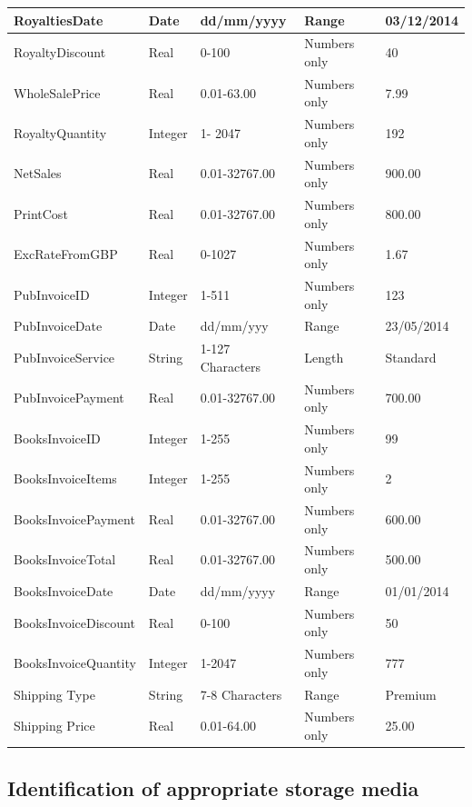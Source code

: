 \begin{center}
\begin{tabular}{|p{2cm}|p{1cm}|p{2.5cm}|p{1.5cm}|p{3cm}|}
    RoyaltiesDate & Date & dd/mm/yyyy & Range & 03/12/2014 \\ \hline
    RoyaltyDiscount & Real & 0-100 & Numbers only & 40 \\ \hline
    WholeSalePrice & Real & 0.01-63.00 & Numbers only & 7.99 \\ \hline
    RoyaltyQuantity & Integer & 1- 2047 & Numbers only & 192 \\ \hline
    NetSales & Real & 0.01-32767.00 & Numbers only & 900.00 \\ \hline
    PrintCost & Real & 0.01-32767.00 & Numbers only & 800.00 \\ \hline
    ExcRateFromGBP & Real & 0-1027 & Numbers only & 1.67 \\ \hline
    PubInvoiceID & Integer & 1-511 & Numbers only & 123 \\ \hline
    PubInvoiceDate & Date & dd/mm/yyy & Range & 23/05/2014 \\ \hline
    PubInvoiceService & String & 1-127 Characters & Length & Standard \\ \hline
    PubInvoicePayment & Real & 0.01-32767.00 & Numbers only & 700.00 \\ \hline
    BooksInvoiceID & Integer & 1-255 & Numbers only & 99 \\ \hline
    BooksInvoiceItems & Integer & 1-255 & Numbers only & 2 \\ \hline
    BooksInvoicePayment & Real & 0.01-32767.00 & Numbers only & 600.00 \\ \hline
    BooksInvoiceTotal & Real & 0.01-32767.00 & Numbers only & 500.00 \\ \hline
    BooksInvoiceDate & Date & dd/mm/yyyy & Range & 01/01/2014 \\ \hline
    BooksInvoiceDiscount & Real & 0-100 & Numbers only & 50 \\ \hline
    BooksInvoiceQuantity & Integer & 1-2047 & Numbers only & 777 \\ \hline
    Shipping Type & String & 7-8 Characters & Range & Premium \\ \hline
    Shipping Price & Real & 0.01-64.00 & Numbers only & 25.00 \\ \hline
    \hline
\end{tabular}
\end{center}

\subsection{Identification of appropriate storage media}

